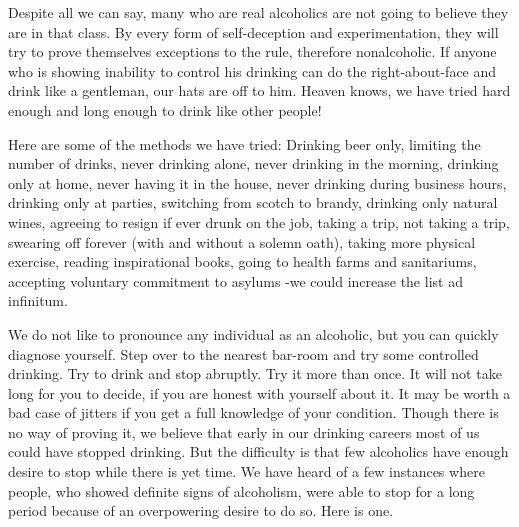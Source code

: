 \begin{biblechapter}
    Despite all we can say, 
    many who are real alcoholics 
    are not going to believe they are in that class. 
\verse By every form of self-deception and experimentation, 
    they will try to prove themselves exceptions to the rule, 
    therefore nonalcoholic. 
\verse If anyone who is showing inability to control his drinking 
    can do the right-about-face and drink like a gentleman, 
    our hats are off to him. 
\verse Heaven knows, we have tried hard enough and long enough 
    to drink like other people!

\verse Here are some of the methods we have tried: 
\verse Drinking beer only, 
    limiting the number of drinks, 
    never drinking alone, 
    never drinking in the morning, 
    drinking only at home, 
    never having it in the house, 
\verse never drinking during business hours, 
    drinking only at parties, 
    switching from scotch to brandy, 
    drinking only natural wines, 
\verse agreeing to resign if ever drunk on the job, 
    taking a trip, 
    not taking a trip, 
    swearing off forever (with and without a solemn oath), 
\verse taking more physical exercise, 
    reading inspirational books, 
    going to health farms and sanitariums, 
    accepting voluntary commitment to asylums 
    -we could increase the list ad infinitum. 
\end{biblechapter}


\begin{biblechapter}
    We do not like to pronounce any individual as an alcoholic, 
    but you can quickly diagnose yourself. 
\verse Step over to the nearest bar-room and try some controlled drinking. 
\verse Try to drink and stop abruptly. 
\verse Try it more than once. 
\verse It will not take long for you to decide, 
    if you are honest with yourself about it. 
\verse It may be worth a bad case of jitters 
    if you get a full knowledge of your condition.
\verse Though there is no way of proving it, 
\verse we believe that early in our drinking careers most of us could have stopped drinking. 
\verse But the difficulty is that few alcoholics have enough desire to stop while there is yet time. 
\verse We have heard of a few instances where people, who showed definite signs of alcoholism, 
\verse were able to stop for a long period because of an overpowering desire to do so. 
\verse Here is one.
\end{biblechapter}


